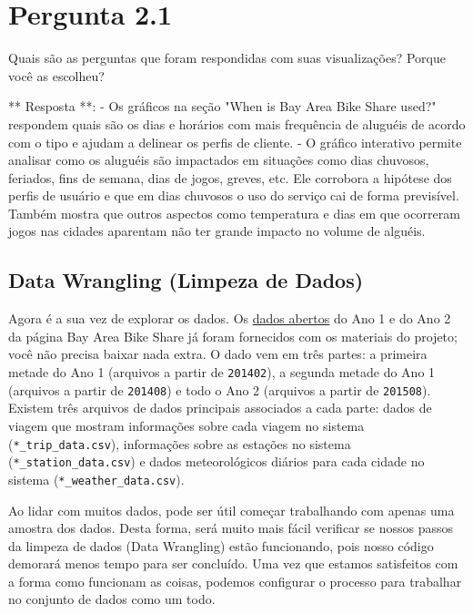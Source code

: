 \documentclass[11pt]{article}
\begin{document}
    \section{Pergunta 2.1}\label{pergunta-2.1}

Quais são as perguntas que foram respondidas com suas visualizações?
Porque você as escolheu?

    ** Resposta **: - Os gráficos na seção "When is Bay Area Bike Share
used?" respondem quais são os dias e horários com mais frequência de
aluguéis de acordo com o tipo e ajudam a delinear os perfis de cliente.
- O gráfico interativo permite analisar como os aluguéis são impactados
em situações como dias chuvosos, feriados, fins de semana, dias de
jogos, greves, etc. Ele corrobora a hipótese dos perfis de usuário e que
em dias chuvosos o uso do serviço cai de forma previsível. Também mostra
que outros aspectos como temperatura e dias em que ocorreram jogos nas
cidades aparentam não ter grande impacto no volume de alguéis.

    \subsection{Data Wrangling (Limpeza de
Dados)}\label{data-wrangling-limpeza-de-dados}

Agora é a sua vez de explorar os dados. Os
\href{http://www.bayareabikeshare.com/open-data}{dados abertos} do Ano 1
e do Ano 2 da página Bay Area Bike Share já foram fornecidos com os
materiais do projeto; você não precisa baixar nada extra. O dado vem em
três partes: a primeira metade do Ano 1 (arquivos a partir de
\texttt{201402}), a segunda metade do Ano 1 (arquivos a partir de
\texttt{201408}) e todo o Ano 2 (arquivos a partir de \texttt{201508}).
Existem três arquivos de dados principais associados a cada parte: dados
de viagem que mostram informações sobre cada viagem no sistema
(\texttt{*\_trip\_data.csv}), informações sobre as estações no sistema
(\texttt{*\_station\_data.csv}) e dados meteorológicos diários para cada
cidade no sistema (\texttt{*\_weather\_data.csv}).

Ao lidar com muitos dados, pode ser útil começar trabalhando com apenas
uma amostra dos dados. Desta forma, será muito mais fácil verificar se
nossos passos da limpeza de dados (Data Wrangling) estão funcionando,
pois nosso código demorará menos tempo para ser concluído. Uma vez que
estamos satisfeitos com a forma como funcionam as coisas, podemos
configurar o processo para trabalhar no conjunto de dados como um todo.
\end{document}
